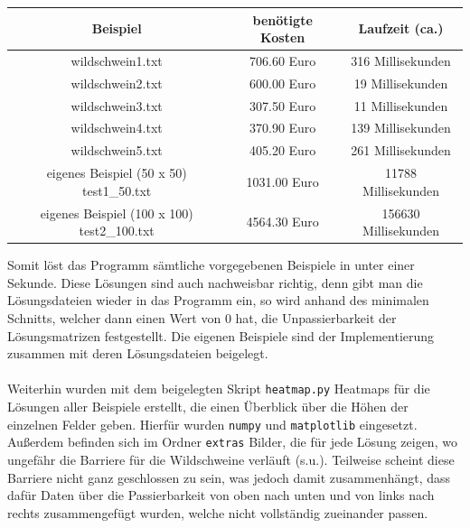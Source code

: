 \documentclass[a4paper, notitlepage, 12pt]{scrartcl}
\begin{document}
 \begin{table}[H]
    \begin{tabular}{|c|c|c|} 
    \hline
    Beispiel                                      & benötigte Kosten & Laufzeit (ca.)       \\ \hline \hline
    wildschwein1.txt                              & 706.60 Euro      & 316 Millisekunden    \\
    wildschwein2.txt                              & 600.00 Euro      & 19 Millisekunden     \\
    wildschwein3.txt                              & 307.50 Euro      & 11 Millisekunden     \\
    wildschwein4.txt                              & 370.90 Euro      & 139 Millisekunden    \\
    wildschwein5.txt                              & 405.20 Euro      & 261 Millisekunden    \\
    eigenes Beispiel  (50 x 50)  test1\_50.txt    & 1031.00 Euro     & 11788 Millisekunden  \\
    eigenes Beispiel  (100 x 100)  test2\_100.txt & 4564.30 Euro     & 156630 Millisekunden \\ \hline
    \end{tabular}
\end{table}
Somit löst das Programm sämtliche vorgegebenen Beispiele in unter einer Sekunde. Diese Lösungen sind auch nachweisbar richtig, denn gibt man die Lösungsdateien wieder in das Programm ein, so wird anhand des minimalen Schnitts, welcher dann einen Wert von 0 hat, die Unpassierbarkeit der Lösungsmatrizen festgestellt. Die eigenen Beispiele sind der Implementierung zusammen mit deren Lösungsdateien beigelegt.
\\ \\
Weiterhin wurden mit dem beigelegten Skript \texttt{heatmap.py} Heatmaps für die Lösungen aller Beispiele erstellt, die einen Überblick über die Höhen der einzelnen Felder geben. Hierfür wurden \texttt{numpy} und \texttt{matplotlib} eingesetzt. Außerdem befinden sich im Ordner \texttt{extras} Bilder, die für jede Lösung zeigen, wo ungefähr die Barriere für die Wildschweine verläuft (s.u.). Teilweise scheint diese Barriere nicht ganz geschlossen zu sein, was jedoch damit zusammenhängt, dass dafür Daten über die Passierbarkeit von oben nach unten und von links nach rechts zusammengefügt wurden, welche nicht vollständig zueinander passen.
\\
\end{document}
